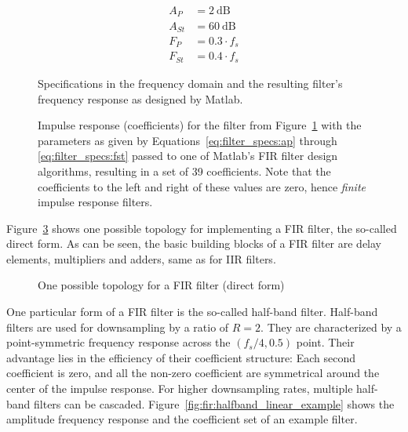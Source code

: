 \begin{align}
    A_P    &= \SI{2}{\dB}   \label{eq:filter_specs:ap}\\
    A_{St} &= \SI{60}{\dB}  \label{eq:filter_specs:ast}\\
    F_P    &= 0.3 \cdot f_s \label{eq:filter_specs:fp}\\
    F_{St} &= 0.4 \cdot f_s \label{eq:filter_specs:fst}
\end{align}

\begin{figure}
    \centering
    
    \caption[Specifying FIR Filter Constraints]{
        Specifications in the frequency domain and the resulting filter's
        frequency response as designed by Matlab.%
    }
    \label{fig:filter_specs:freqResponse}
\end{figure}

\begin{figure}
    \centering
    
    \caption[Impulse Response of a FIR Filter]{
        Impulse    response    (coefficients)     for    the    filter    from
        Figure~\ref{fig:filter_specs:freqResponse}    with   the    parameters
        as     given     by     Equations~\ref{eq:filter_specs:ap}     through
        \ref{eq:filter_specs:fst} passed to one  of Matlab's FIR filter design
        algorithms, resulting  in a set  of \num{39} coefficients.   Note that
        the coefficients to the left and right of these values are zero, hence
        \emph{finite} impulse response filters.%
    }
    \label{fig:filter_specs:coefs}
\end{figure}

Figure~\ref{fig:filtertopologies:fir}   shows   one  possible   topology   for
implementing a  FIR filter,  the so-called  direct form. As  can be  seen, the
basic building  blocks of  a FIR  filter are  delay elements,  multipliers and
adders, same as for IIR filters.

\begin{figure}
    \centering
    
    \caption[FIR Filter Topology Example]
        {One possible topology for a FIR filter (direct form)}
    \label{fig:filtertopologies:fir}
\end{figure}

One   particular  form   of  a   FIR   filter  is   the  so-called   half-band
filter. Half-band  filters   are  used   for  downsampling   by  a   ratio  of
$R=2$.   They  are  characterized  by  a  point-symmetric  frequency  response
across  the $(f_s/4,0.5)$  point. Their advantage  lies in  the efficiency  of
their  coefficient structure: Each  second coefficient  is zero,  and all  the
non-zero  coefficient  are  symmetrical  around  the  center  of  the  impulse
response. For  higher  downsampling  rates,  multiple  half-band  filters  can
be cascaded. Figure~\ref{fig:fir:halfband_linear_example}  shows the amplitude
frequency response and the coefficient set of an example filter.

